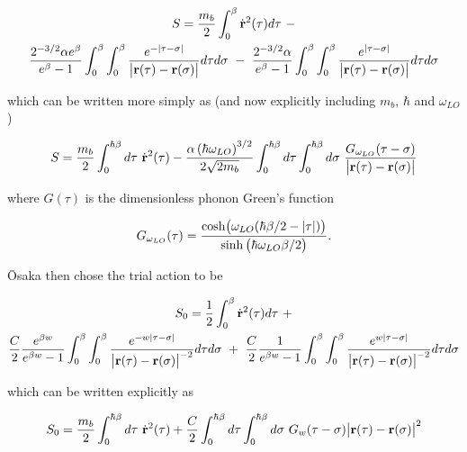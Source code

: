 \begin{equation}
    \begin{gathered}
    S = \frac{m_b}{2} \int_0^\beta \dot{\vb{r}}^2(\tau) d\tau\ -\\ \frac{2^{-3/2}\alpha e^\beta}{e^\beta - 1} \int_0^\beta \int_0^\beta \frac{e^{-|\tau-\sigma|}}{\left| \vb{r}(\tau) - \vb{r}(\sigma) \right|} d\tau d\sigma \ -\  \frac{2^{-3/2}\alpha}{e^\beta - 1} \int_0^\beta \int_0^\beta \frac{e^{|\tau-\sigma|}}{\left| \vb{r}(\tau) - \vb{r}(\sigma) \right|} d\tau d\sigma
    \end{gathered}
\end{equation}

which can be written more simply as (and now explicitly including $m_b$, $\hbar$ and $\omega_{LO}$)

\begin{equation}\label{eqn:thermal_action}
    S = \frac{m_b}{2} \int_0^{\hbar\beta} d\tau\ \dot{\vb{r}}^2(\tau) - \frac{\alpha \left(\hbar \omega_{LO}\right)^{3/2}}{2\sqrt{2 m_b}} \int_0^{\hbar\beta} d\tau \int_0^{\hbar\beta} d\sigma\ \frac{G_{\omega_{LO}}(\tau - \sigma)}{\abs{\vb{r}(\tau) - \vb{r}(\sigma)}}
\end{equation}

where $G(\tau)$ is the dimensionless phonon Green's function

\begin{equation}
    G_{\omega_{LO}}(\tau) = \frac{\cosh(\omega_{LO} (\hbar\beta/2 - \abs{\tau}))}{\sinh\left(\hbar\omega_{LO}\beta/2\right)}.
\end{equation}

\=Osaka then chose the trial action to be

\begin{equation}
    \begin{gathered}
    S_0 = \frac{1}{2} \int_0^\beta \dot{\vb{r}}^2(\tau) d\tau\ +\\ \frac{C}{2}\frac{e^{\beta w}}{e^{\beta w} - 1} \int_0^\beta \int_0^\beta \frac{e^{-w|\tau-\sigma|}}{\left| \vb{r}(\tau) - \vb{r}(\sigma) \right|^{-2}} d\tau d\sigma \ +\ \frac{C}{2}\frac{1}{e^{\beta w} - 1} \int_0^\beta \int_0^\beta \frac{e^{w|\tau-\sigma|}}{\left| \vb{r}(\tau) - \vb{r}(\sigma) \right|^{-2}} d\tau d\sigma
    \end{gathered}
\end{equation}

which can be written explicitly as

\begin{equation}\label{eqn:thermal_trial_action}
    S_0 = \frac{m_b}{2} \int_0^{\hbar\beta} d\tau\ \dot{\vb{r}}^2(\tau) + \frac{C}{2} \int_0^{\hbar\beta} d\tau \int_0^{\hbar\beta} d\sigma\ G_w(\tau - \sigma) \abs{\vb{r}(\tau) - \vb{r}(\sigma)}^2
\end{equation}

